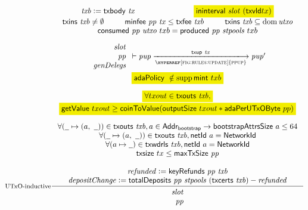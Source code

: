 \begin{figure}[htb]
  \begin{equation}\label{eq:utxo-inductive-shelley}
    \inference[UTxO-inductive]
    { \var{txb}\leteq\txbody{tx}
      & \hldiff{\fun{ininterval}~\var{slot}~(\fun{txvld}{tx})}
      \\ \txins{txb} \neq \emptyset
      & \minfee{pp}{tx} \leq \txfee{txb}
      & \txins{txb} \subseteq \dom \var{utxo}
      \\
      \consumed{pp}{utxo}~{txb} = \produced{pp}{stpools}~{txb}
      \\
      ~
      \\
      {
        \begin{array}{r}
          \var{slot} \\
          \var{pp} \\
          \var{genDelegs} \\
        \end{array}
      }
      \vdash \var{pup} \trans{\hyperref[fig:rules:update]{ppup}}{\fun{txup}~\var{tx}} \var{pup'}
      \\
      ~
      \\
      \hldiff{\mathsf{adaPolicy}~\notin \supp{\fun{mint}~txb}} \\
      ~\\
      \hldiff{\forall txout \in \txouts{txb},} \\
      \hldiff{\fun{getValue}~txout \geq \fun{coinToValue}(\fun{outputSize}~{txout} * \fun{adaPerUTxOByte}~pp)} \\~
      \\
      \forall (\wcard\mapsto (a,~\wcard)) \in \txouts{txb}, a \in \AddrBS \to \fun{bootstrapAttrsSize}~a \leq 64
      \\
      \forall (\wcard\mapsto (a,~\wcard)) \in \txouts{txb}, \fun{netId}~a =\NetworkId
      \\
      \forall (a\mapsto\wcard) \in \txwdrls{txb}, \fun{netId}~a =\NetworkId
      \\
      \fun{txsize}~{tx}\leq\fun{maxTxSize}~\var{pp}
      \\
      ~
      \\
      \var{refunded} \leteq \keyRefunds{pp}{txb}
      \\
      \var{depositChange} \leteq
        \totalDeposits{pp}{stpools}{(\txcerts{txb})} - \var{refunded}
    }
    {
      \begin{array}{r}
        \var{slot}\\
        \var{pp}\\

\end{array}}
\end{equation}
\end{figure}

